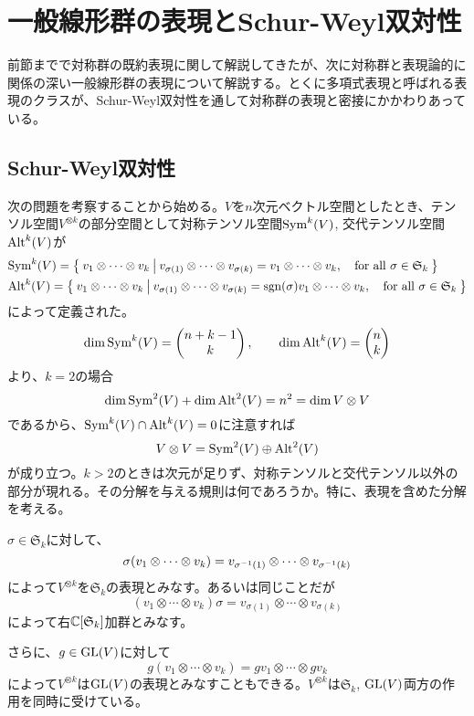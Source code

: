 \documentclass{ltjsreport}
\begin{document}
\section{一般線形群の表現とSchur-Weyl双対性}

前節までで対称群の既約表現に関して解説してきたが、次に対称群と表現論的に関係の深い一般線形群の表現について解説する。とくに多項式表現と呼ばれる表現のクラスが、Schur-Weyl双対性を通して対称群の表現と密接にかかわりあっている。


\subsection{Schur-Weyl双対性}

次の問題を考察することから始める。$V$を$n$次元ベクトル空間としたとき、テンソル空間$V^{\otimes k}$の部分空間として対称テンソル空間$\text{Sym}^k(V)$, 交代テンソル空間$\text{Alt}^k(V)$が
\begin{align*}
  &\text{Sym}^k(V)=\left\{\:v_1\otimes\cdots\otimes v_k\:\middle|\:v_{\sigma(1)}\otimes\cdots\otimes v_{\sigma (k)}=v_1\otimes\cdots\otimes v_k,\quad\text{for all $\sigma\in\mathfrak{S}_k$}\:\right\}\\
  &\text{Alt}^k(V)=\left\{\:v_1\otimes\cdots\otimes v_k\:\middle|\:v_{\sigma(1)}\otimes\cdots\otimes v_{\sigma (k)}=\mathrm{sgn}(\sigma)v_1\otimes\cdots\otimes v_k,\quad\text{for all $\sigma\in\mathfrak{S}_k$}\:\right\}
\end{align*}
によって定義された。
\[
\dim\text{Sym}^k(V)=\begin{pmatrix} n+k-1\\k \end{pmatrix},\qquad\dim\text{Alt}^k(V)=\begin{pmatrix} n\\k \end{pmatrix}  
\]
より、$k=2$の場合
\[
\dim\text{Sym}^2(V)+\dim\text{Alt}^2(V)=n^2=\dim V\otimes V  
\]
であるから、$\text{Sym}^k(V)\cap\text{Alt}^k(V)=0$に注意すれば
\[
V\otimes V=\text{Sym}^2(V)\oplus\text{Alt}^2(V)  
\]
が成り立つ。$k>2$のときは次元が足りず、対称テンソルと交代テンソル以外の部分が現れる。その分解を与える規則は何であろうか。特に、表現を含めた分解を考える。

$\sigma\in \mathfrak{S}_k$に対して、
\[
\sigma(v_1\otimes\cdots\otimes v_k)=v_{\sigma^{-1}(1)}\otimes\cdots\otimes v_{\sigma^{-1}(k)}  
\]
によって$V^{\otimes k}$を$\mathfrak{S}_k$の表現とみなす。あるいは同じことだが
\[
  (v_1\otimes\cdots\otimes v_k)\sigma=v_{\sigma(1)}\otimes\cdots\otimes v_{\sigma(k)}
\]
によって右$\mathbb{C}[\mathfrak{S}_k]$加群とみなす。

さらに、$g\in \text{GL}(V)$に対して
\[
g(v_1\otimes\cdots\otimes v_k)=gv_1\otimes\cdots\otimes gv_k  
\]
によって$V^{\otimes k}$は$\text{GL}(V)$の表現とみなすこともできる。$V^{\otimes k}$は$\mathfrak{S}_k$, $\text{GL}(V)$両方の作用を同時に受けている。
\end{document}
